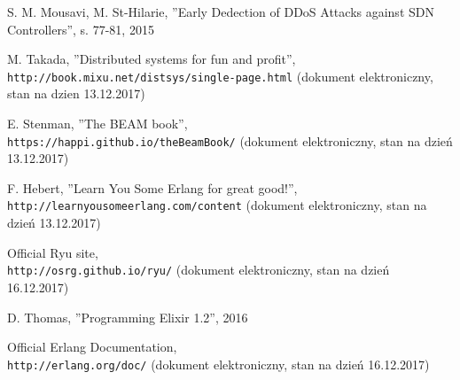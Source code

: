 \begin{thebibliography}{99}
S. M. Mousavi, M. St-Hilarie,
''Early Dedection of DDoS Attacks against SDN Controllers'',
s. 77-81, 2015

M. Takada,
''Distributed systems for fun and profit'',
\\\texttt{http://book.mixu.net/distsys/single-page.html} (dokument
elektroniczny, stan na dzien 13.12.2017)

E. Stenman,
''The BEAM book'',
\\\texttt{https://happi.github.io/theBeamBook/} (dokument elektroniczny, stan na
dzień 13.12.2017)

F. Hebert,
''Learn You Some Erlang for great good!'',
\\\texttt{http://learnyousomeerlang.com/content} (dokument elektroniczny, stan
na dzień 13.12.2017)

Official Ryu site,
\\\texttt{http://osrg.github.io/ryu/} (dokument elektroniczny, stan
na dzień 16.12.2017)

D. Thomas,
''Programming Elixir 1.2'',
2016 

Official Erlang Documentation,
\\\texttt{http://erlang.org/doc/} (dokument elektroniczny, stan
na dzień 16.12.2017)
\end{thebibliography}
